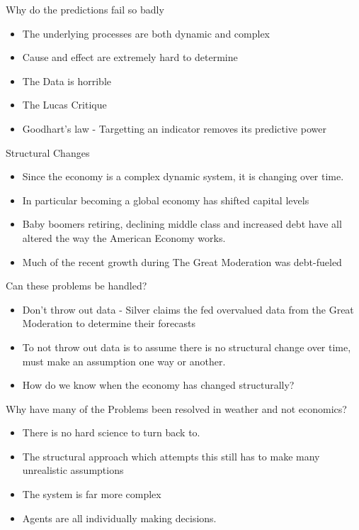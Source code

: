 \documentclass[bigger]{beamer}
\begin{document}
\begin{frame}[label=sec-3-2-2]{Why do the predictions fail so badly}
\begin{itemize}
\item The underlying processes are both dynamic and complex
\item Cause and effect are extremely hard to determine
\item The Data is horrible
\item The Lucas Critique
\item Goodhart's law - Targetting an indicator removes its predictive
power
\end{itemize}
\end{frame}

\begin{frame}[label=sec-3-2-3]{Structural Changes}
\begin{itemize}
\item Since the economy is a complex dynamic system, it is changing over
time.
\item In particular becoming a global economy has shifted capital levels
\item Baby boomers retiring, declining middle class and increased debt
have all altered the way the American Economy works.
\item Much of the recent growth during The Great Moderation was
debt-fueled
\end{itemize}
\end{frame}

\begin{frame}[label=sec-3-2-4]{Can these problems be handled?}
\begin{itemize}
\item Don't throw out data - Silver claims the fed overvalued data from
the Great Moderation to determine their forecasts
\item To not throw out data is to assume there is no structural change
over time, must make an assumption one way or another.
\item How do we know when the economy has changed structurally?
\end{itemize}
\end{frame}

\begin{frame}[label=sec-3-2-5]{Why have many of the Problems been resolved in weather and not economics?}
\begin{itemize}
\item There is no hard science to turn back to.
\item The structural approach which attempts this still has to make many
unrealistic assumptions
\item The system is far more complex
\item Agents are all individually making decisions.
\end{itemize}
\end{frame}
\end{document}
